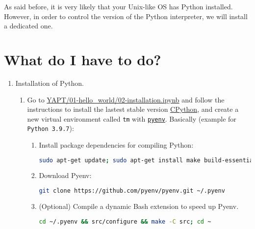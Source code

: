 As said before, it is very likely that your Unix-like OS has Python
installed. However, in order to control the version of the Python
interpreter, we will install a dedicated one.

\section{What do I have to do?}

\begin{enumerate}
  
\item Installation of Python.
  
  \begin{enumerate}
    
  \item Go to
    \href{https://github.com/vicente-gonzalez-ruiz/YAPT/blob/master/01-hello_world/02-installation.ipynb}{YAPT/01-hello\_world/02-installation.ipynb}
    \cite{YAPT} and follow the instructions to install the lastest
    stable version
    \href{https://en.wikipedia.org/wiki/CPython}{CPython}, and create
    a new virtual environment called \texttt{tm} with
    \href{https://github.com/pyenv/pyenv}{\texttt{pyenv}}. Basically
    (example for \verb|Python 3.9.7|):

    \begin{enumerate}
    \item Install package dependencies for compiling Python:
      
      \begin{lstlisting}[mathescape=false, language=Bash]
sudo apt-get update; sudo apt-get install make build-essential libssl-dev zlib1g-dev libbz2-dev libreadline-dev libsqlite3-dev wget curl llvm libncursesw5-dev xz-utils tk-dev libxml2-dev libxmlsec1-dev libffi-dev liblzma-dev
\end{lstlisting}

\item Download Pyenv:
  \begin{lstlisting}[mathescape=false, language=Bash]
git clone https://github.com/pyenv/pyenv.git ~/.pyenv
\end{lstlisting}
        
\item (Optional) Compile a dynamic Bash extension to speed up Pyenv.
  \begin{lstlisting}[mathescape=false, language=Bash]
cd ~/.pyenv && src/configure && make -C src; cd ~
\end{lstlisting}


\end{enumerate}
\end{enumerate}
\end{enumerate}
